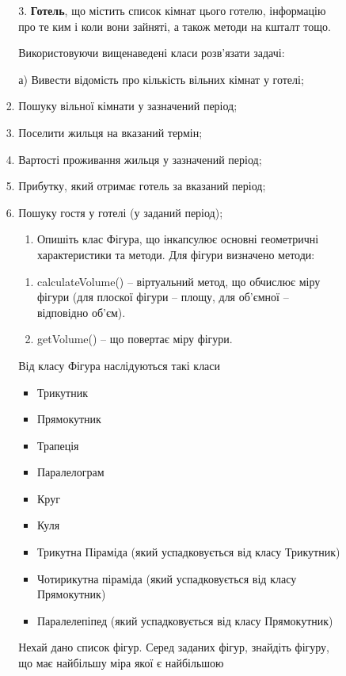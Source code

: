 \documentclass[]{article}
\makeatletter
\newcommand{\xslalph}[1]{\expandafter\@xslalph\csname c@#1\endcsname}
\newcommand{\@xslalph}[1]{%
    \ifcase#1\or а\or б\or в\or г\or д\or e\or є\or ж\or з\or i%
    \or й\or к\or л\or м\or н\or о\or п\or р\or с\or т%
    \or у\or ф\or х\or ц\or ч\or ш\or ю\or я\or аа\or бб\or вв%
    \else\@ctrerr\fi%
}
\makeatother
\begin{document}
\begin{enumerate}
\begin{enumerate}[label=\xslalph*)]
\begin{enumerate}
\begin{enumerate}[label=\xslalph*)]
3. \textbf{Готель}, що містить список кімнат цього готелю, інформацію
про те ким і коли вони зайняті, а також методи на кшталт тощо.

Використовуючи вищенаведені класи розв'язати задачі:

а) Вивести відомість про кількість вільних кімнат у готелі;
\item Пошуку вільної кімнати у зазначений період;
\item Поселити жильця на вказаний термін;
\item Вартості проживання жильця у зазначений період;
\item Прибутку, який отримає готель за вказаний період;
\item Пошуку гостя у готелі (у заданий період);

\begin{enumerate}
\def\labelenumi{\arabic{enumi})}
\item
  Опишіть клас Фігура, що інкапсулює основні геометричні характеристики
  та методи. Для фігури визначено методи:
\end{enumerate}

\begin{enumerate}
\def\labelenumi{\arabic{enumi}.}
\item
  calculateVolume() -- віртуальний метод, що обчислює міру фігури (для
  плоскої фігури -- площу, для об'ємної -- відповідно об'єм).
\item
  getVolume() -- що повертає міру фігури.
\end{enumerate}

Від класу Фігура наслідуються такі класи

\begin{itemize}
\item
  Трикутник
\item
  Прямокутник
\item
  Трапеція
\item
  Паралелограм
\item
  Круг
\item
  Куля
\item
  Трикутна Піраміда (який успадковується від класу Трикутник)
\item
  Чотирикутна піраміда (який успадковується від класу Прямокутник)
\item
  Паралелепіпед (який успадковується від класу Прямокутник)
\end{itemize}

Нехай дано список фігур. Серед заданих фігур, знайдіть фігуру, що має
найбільшу міра якої є найбільшою


\end{enumerate}
\end{enumerate}
\end{enumerate}
\end{enumerate}
\end{document}

